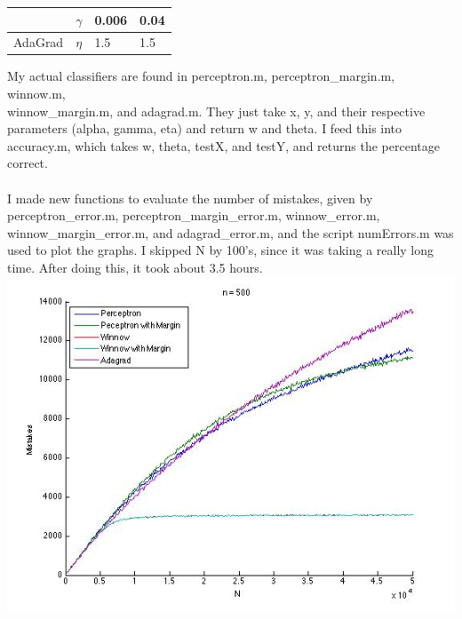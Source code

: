 \begin{enumerate}
\begin{center}
\begin{table}[!hbp]
\begin{tabular}{|p{4.3cm}<{\centering}|p{2.5cm}<{\centering}|p{4cm}<{\centering}|p{4cm}<{\centering}|}
      \cline{2-4}
      & $\gamma$ & 0.006 & 0.04 \\ \hline %
      AdaGrad             & $\eta$&   1.5                                   &    1.5                               \\\hline %
    \end{tabular}
    \end{table}
  \end{center}
My actual classifiers are found in perceptron.m, perceptron\_margin.m, winnow.m, \\winnow\_margin.m, and adagrad.m. They just take x, y, and their respective parameters (alpha, gamma, eta) and return w and theta. I feed this into accuracy.m, which takes w, theta, testX, and testY, and returns the percentage correct.\\\\
I made new functions to evaluate the number of mistakes, given by perceptron\_error.m, perceptron\_margin\_error.m, winnow\_error.m, winnow\_margin\_error.m, and adagrad\_error.m, and the script numErrors.m was used to plot the graphs. I skipped N by 100's, since it was taking a really long time. After doing this, it took about 3.5 hours.\\
  \includegraphics[scale=0.5]{HW3_code/n500}\\

\end{enumerate}
